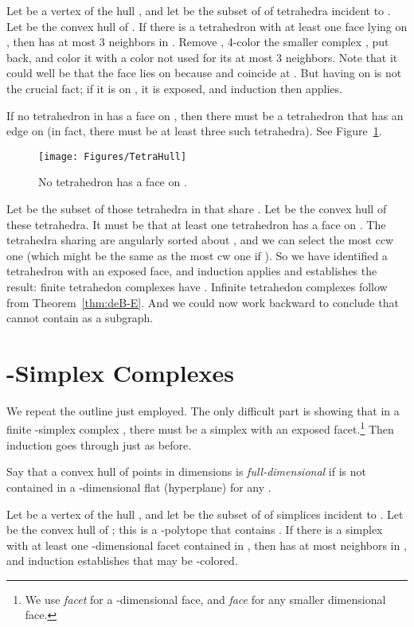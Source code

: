 \pdfoutput=1  \documentclass[]{article}
\newcommand{\figlab}[1]{\label{fig:#1}}
\newcommand{\thmref}[1]{\ref{thm:#1}}
\newcommand{\figref}[1]{\ref{fig:#1}}
\begin{document}
Let  be a vertex of the hull , and let  be the subset of
 of tetrahedra incident to .
Let  be the convex hull of .
If there is a tetrahedron  with at least one face  lying
on , then  has at most 3 neighbors in .  Remove ,
4-color the smaller complex , put  back, and color it with a
color not used for its at most 3 neighbors.
Note that it could well be that the face  lies on  because
 and  coincide at .  But having  on  is not the
crucial fact; if it is on , it is exposed, and induction then
applies.

If no tetrahedron in  has a face on , then there must be a
tetrahedron
 that has an edge  on  
(in fact, there must be at least three such tetrahedra).
See Figure~\figref{TetraHull}.
\begin{figure}[htbp]
\centering
\texttt{[image: Figures/TetraHull]}
\caption{No tetrahedron has a face on .}
\figlab{TetraHull}
\end{figure}


Let  be the subset of those tetrahedra in  that share .
Let  be the convex hull of these tetrahedra.
It must be that at least one tetrahedron has a face on .
The tetrahedra sharing  are angularly sorted about , and we can
select
the most ccw one (which might be the same as the most cw one if
).
So we have identified a tetrahedron with an exposed face, and
induction applies and establishes the result:
finite tetrahedon complexes have .
Infinite tetrahedon complexes follow from 
Theorem~\thmref{deB-E}.
And we could now work backward to conclude that  cannot contain
 as a subgraph.

\section{-Simplex Complexes}
We repeat the outline just employed.
The only difficult part is showing that in a finite -simplex
complex , there must be a simplex with an exposed facet.\footnote{
   We use \emph{facet} for a -dimensional face, and
   \emph{face} for any smaller dimensional face.
}
Then induction goes through just as before.

Say that a convex hull  of points in  dimensions is \emph{full-dimensional}
if  is not contained in a -dimensional flat (hyperplane)
for any .

Let  be a vertex of the hull , and let  be the subset of
 of simplices incident to .
Let  be the convex hull of ;
this is a -polytope that contains .
If there is a simplex  with at least one
-dimensional facet  
contained in , then  has at most  neighbors in ,
and induction establishes that  may be -colored.
\end{document}
